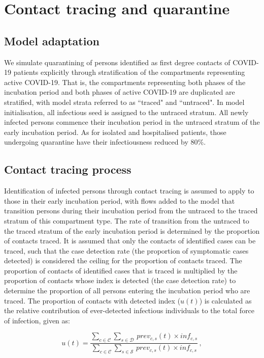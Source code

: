 \section{Contact tracing and quarantine}

\subsection{Model adaptation}
We simulate quarantining of persons identified as first degree contacts of COVID-19 patients explicitly through stratification of the compartments representing active COVID-19.
That is, the compartments representing both phases of the incubation period and both phases of active COVID-19 are duplicated are stratified, with model strata referred to as ``traced" and ``untraced".
In model initialisation, all infectious seed is assigned to the untraced stratum.
All newly infected persons commence their incubation period in the untraced stratum of the early incubation period.
As for isolated and hospitalised patients, those undergoing quarantine have their infectiousness reduced by 80\%.

\subsection{Contact tracing process}
Identification of infected persons through contact tracing is assumed to apply to those in their early incubation period, with flows added to the model that transition persons during their incubation period from the untraced to the traced stratum of this compartment type.
The rate of transition from the untraced to the traced stratum of the early incubation period is determined by the proportion of contacts traced.
It is assumed that only the contacts of identified cases can be traced, such that the case detection rate (the proportion of symptomatic cases detected) is considered the ceiling for the proportion of contacts traced.
The proportion of contacts of identified cases that is traced is multiplied by the proportion of contacts whose index is detected (the case detection rate) to determine the proportion of all persons entering the incubation period who are traced.
The proportion of contacts with detected index (\(u(t)\)) is calculated as the relative contribution of ever-detected infectious individuals to the total force of infection, given as:

\[
u(t) = \frac
{\sum_{c \in \mathcal{C}} \sum_{s \in \mathcal{D}} \, prev_{c, s}(t) \times inf_{c, s}}
{\sum_{c \in \mathcal{C}} \sum_{s \in \mathcal{S}} \, prev_{c, s}(t) \times inf_{c, s}} \, ,
\]

